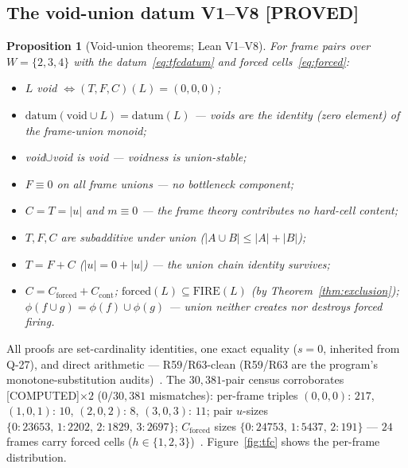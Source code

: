 \documentclass[11pt,a4paper]{article}
\newtheorem{proposition}{Proposition}
\theoremstyle{definition}
\begin{document}
\subsection{The void-union datum V1--V8 [PROVED]}

\begin{proposition}[Void-union theorems; Lean V1--V8]
  \label{prop:v}
  For frame pairs over $W=\{2,3,4\}$ with the datum~\eqref{eq:tfcdatum}
  and forced cells~\eqref{eq:forced}:
  \begin{itemize}
  \item[V1] $L$ void $\iff (T,F,C)(L)=(0,0,0)$;
  \item[V2] $\mathrm{datum}(\mathrm{void}\cup L)=\mathrm{datum}(L)$ —
    voids are the identity (zero element) of the frame-union monoid;
  \item[V3] void$\cup$void is void — voidness is union-stable;
  \item[V4] $F\equiv0$ on all frame unions — no bottleneck component;
  \item[V5] $C=T=|u|$ and $m\equiv0$ — the frame theory contributes no
    hard-cell content;
  \item[V6] $T,F,C$ are subadditive under union
    ($|A\cup B|\le|A|+|B|$);
  \item[V7] $T=F+C$ ($|u|=0+|u|$) — the union chain identity survives;
  \item[V8] $C=C_{\mathrm{forced}}+C_{\mathrm{cont}}$;
    $\mathrm{forced}(L)\subseteq\mathrm{FIRE}(L)$ (by
    Theorem~\ref{thm:exclusion});
    $\phi(f\cup g)=\phi(f)\cup\phi(g)$ — union neither creates nor
    destroys forced firing.
  \end{itemize}
\end{proposition}

All proofs are set-cardinality identities, one exact equality
($s=0$, inherited from Q-27), and direct arithmetic — R59/R63-clean
(R59/R63 are the program's monotone-substitution audits)~\cite{D289}.
The $30{,}381$-pair census corroborates [COMPUTED]$\times2$ ($0/30{,}381$
mismatches): per-frame triples $(0,0,0){:}\,217$,
$(1,0,1){:}\,10$, $(2,0,2){:}\,8$, $(3,0,3){:}\,11$; pair $u$-sizes
$\{0{:}23653,\,1{:}2202,\,2{:}1829,\,3{:}2697\}$; $C_{\mathrm{forced}}$
sizes $\{0{:}24753,\,1{:}5437,\,2{:}191\}$ — $24$ frames carry forced
cells ($h\in\{1,2,3\}$)~\cite{D289}. Figure~\ref{fig:tfc} shows the
per-frame distribution.
\end{document}
